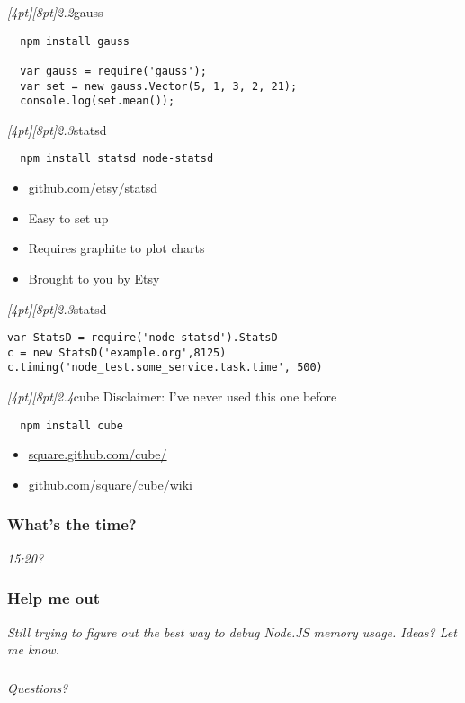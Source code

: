 \documentclass{beamer}
\newcommand{\sn}[1]{\textrm{\textit{\Huge{\raisebox{-3pt}[4pt][8pt]{\textcolor{f2elblue}{#1}}}}}\hspace{4pt}}
\newcommand{\innersplash}[1]{
  \begin{center}
    \large \textrm{\textit{ #1 } }
  \end{center}
}
\newcommand{\splashslide}[2][{}]{
  \begin{frame}
  \frametitle{#1}
  \innersplash{#2}
  \end{frame}
}
\begin{document}
\begin{frame}[fragile]{\sn{2.2}gauss}
\begin{verbatim}
  npm install gauss

  var gauss = require('gauss');
  var set = new gauss.Vector(5, 1, 3, 2, 21);
  console.log(set.mean());
\end{verbatim}
\end{frame}


\begin{frame}[fragile]{\sn{2.3}statsd}
\begin{verbatim}
  npm install statsd node-statsd
\end{verbatim}
\begin{itemize}
  \item \href{https://github.com/etsy/statsd}{github.com/etsy/statsd}
  \item Easy to set up
  \item Requires graphite to plot charts
  \item Brought to you by Etsy
\end{itemize}
\end{frame}

\begin{frame}[fragile]{\sn{2.3}statsd}
\begin{verbatim}
var StatsD = require('node-statsd').StatsD
c = new StatsD('example.org',8125)
c.timing('node_test.some_service.task.time', 500)
\end{verbatim}
\end{frame}

\begin{frame}[fragile]{\sn{2.4}cube}
Disclaimer: I've never used this one before
\begin{verbatim}
  npm install cube
\end{verbatim}
\begin{itemize}
  \item \href{http://square.github.com/cube/}{square.github.com/cube/}
  \item \href{https://github.com/square/cube/wiki}{github.com/square/cube/wiki}
\end{itemize}
\end{frame}

\splashslide[What's the time?]{\LARGE 15:20?}

\splashslide[Help me out]{Still trying to figure out the best way to debug Node.JS memory usage. Ideas? Let me know.}

\splashslide{\LARGE Questions?}
\end{document}
